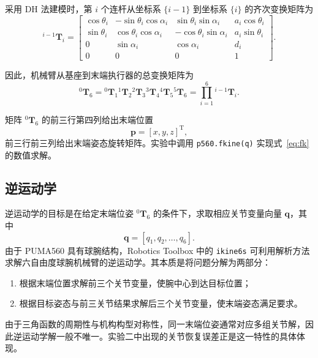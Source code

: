 \documentclass[UTF8,a4paper,12pt]{ctexart}
\begin{document}
采用 DH 法建模时，第 $i$ 个连杆从坐标系 $\{i-1\}$ 到坐标系 $\{i\}$ 的齐次变换矩阵为
\begin{equation}
{}^{i-1}\mathbf{T}_i=
\begin{bmatrix}
\cos\theta_i & -\sin\theta_i\cos\alpha_i & \sin\theta_i\sin\alpha_i & a_i\cos\theta_i \\
\sin\theta_i & \cos\theta_i\cos\alpha_i  & -\cos\theta_i\sin\alpha_i & a_i\sin\theta_i \\
0            & \sin\alpha_i              & \cos\alpha_i              & d_i \\
0            & 0                         & 0                         & 1
\end{bmatrix}.
\label{eq:Ai}
\end{equation}

因此，机械臂从基座到末端执行器的总变换矩阵为
\begin{equation}
{}^{0}\mathbf{T}_6={}^{0}\mathbf{T}_1 {}^{1}\mathbf{T}_2 {}^{2}\mathbf{T}_3 {}^{3}\mathbf{T}_4 {}^{4}\mathbf{T}_5 {}^{5}\mathbf{T}_6
=\prod_{i=1}^{6} {}^{i-1}\mathbf{T}_i.
\label{eq:fk}
\end{equation}

矩阵 ${}^{0}\mathbf{T}_6$ 的前三行第四列给出末端位置
\begin{equation}
\mathbf{p}=[x,y,z]^\mathrm{T},
\end{equation}
前三行前三列给出末端姿态旋转矩阵。实验中调用 \texttt{p560.fkine(q)} 实现式~\eqref{eq:fk} 的数值求解。

\subsection{逆运动学}

逆运动学的目标是在给定末端位姿 ${}^{0}\mathbf{T}_6$ 的条件下，求取相应关节变量向量 $\mathbf{q}$，其中
\begin{equation}
\mathbf{q}=[q_1,q_2,\ldots,q_6].
\end{equation}
由于 PUMA560 具有球腕结构，Robotics Toolbox 中的 \texttt{ikine6s} 可利用解析方法求解六自由度球腕机械臂的逆运动学。其本质是将问题分解为两部分：
\begin{enumerate}
  \item 根据末端位置求解前三个关节变量，使腕中心到达目标位置；
  \item 根据目标姿态与前三关节结果求解后三个关节变量，使末端姿态满足要求。
\end{enumerate}

由于三角函数的周期性与机构构型对称性，同一末端位姿通常对应多组关节解，因此逆运动学解一般不唯一。实验二中出现的关节恢复误差正是这一特性的具体体现。
\end{document}
